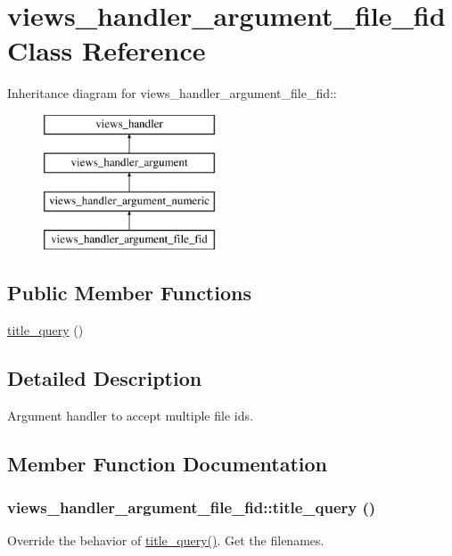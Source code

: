 \hypertarget{classviews__handler__argument__file__fid}{
\section{views\_\-handler\_\-argument\_\-file\_\-fid Class Reference}
\label{classviews__handler__argument__file__fid}
}
Inheritance diagram for views\_\-handler\_\-argument\_\-file\_\-fid::\begin{figure}[H]
\begin{center}
\leavevmode
\includegraphics[height=4cm]{classviews__handler__argument__file__fid}
\end{center}
\end{figure}
\subsection*{Public Member Functions}
\begin{DoxyCompactItemize}
\item 
\hyperlink{classviews__handler__argument__file__fid_af5b40f038d917835dfc95c22b2d7c0ee}{title\_\-query} ()
\end{DoxyCompactItemize}


\subsection{Detailed Description}
Argument handler to accept multiple file ids. 

\subsection{Member Function Documentation}
\hypertarget{classviews__handler__argument__file__fid_af5b40f038d917835dfc95c22b2d7c0ee}{
\subsubsection[{title\_\-query}]{\setlength{\rightskip}{0pt plus 5cm}views\_\-handler\_\-argument\_\-file\_\-fid::title\_\-query ()}}
\label{classviews__handler__argument__file__fid_af5b40f038d917835dfc95c22b2d7c0ee}
Override the behavior of \hyperlink{classviews__handler__argument__file__fid_af5b40f038d917835dfc95c22b2d7c0ee}{title\_\-query()}. Get the filenames. 

